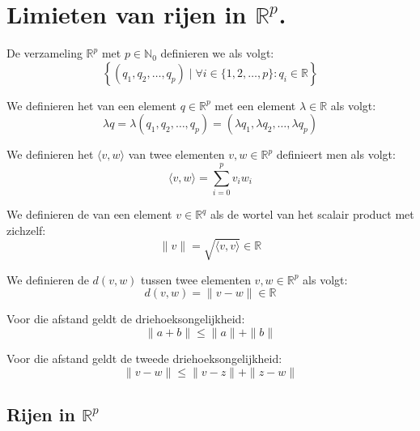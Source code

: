 \documentclass[main.tex]{subfiles}
\begin{document}
\section{Limieten van rijen in $\mathbb{R}^{p}$.}
\label{cha:cont-voor-funct}

\begin{de}
  De verzameling $\mathbb{R}^{p}$ met $p\in \mathbb{N}_{0}$ definieren we als volgt:
  \[ \left\{ (q_{1},q_{2},\dotsc,q_{p}) \mid \forall i \in \{1,2,\dotsc,p\}: q_{i}\in \mathbb{R} \right\} \]
\end{de}

\begin{de}
  We definieren het  van een element $q\in \mathbb{R}^{p}$ met een element $\lambda\in \mathbb{R}$ als volgt:
  \[ \lambda q = \lambda (q_{1},q_{2},\dotsc,q_{p}) = (\lambda q_{1},\lambda q_{2},\dotsc,\lambda q_{p}) \]
\end{de}

\begin{de}
  We definieren het  $\langle v,w \rangle$ van twee elementen $v,w\in \mathbb{R}^{p}$ definieert men als volgt:
  \[ \langle v,w \rangle = \sum_{i=0}^{p}v_{i}w_{i} \]
\end{de}

\begin{de}
  We definieren de  van een element $v\in \mathbb{R}^{q}$ als de wortel van het scalair product met zichzelf:
  \[ \|v\| = \sqrt{\langle v,v \rangle} \in \mathbb{R} \]
\end{de}

\begin{de}
  We definieren de  $d(v,w)$ tussen twee elementen $v,w \in \mathbb{R}^{p}$ als volgt:
  \[ d(v,w) = \|v-w\| \in \mathbb{R} \]
\end{de}

\begin{st}
  \label{st:eerste-driehoeksongelijkheid-rp}
  Voor die afstand geldt de driehoeksongelijkheid:
  \[ \|a+b\| \le \|a\| + \|b\| \]
\end{st}

\begin{st}
  \label{st:tweede-driehoeksongelijkheid-rp}
  Voor die afstand geldt de tweede driehoeksongelijkheid:
  \[ \|v-w\| \le \|v-z\| + \|z-w\| \]
\end{st}

\subsection{Rijen in $\mathbb{R}^p$}
\label{sec:rijen-mathbbrp}
\end{document}
